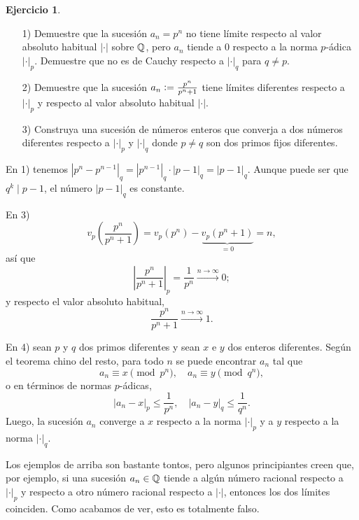 \documentclass{article}
\numberwithin{equation}{section}
\theoremstyle{definition}
\newtheorem{ejerc}{Ejercicio}
\begin{document}
\begin{ejerc}
  ~

  \begin{enumerate}
  \item[1)] Demuestre que la sucesión $a_n = p^n$ no tiene límite respecto
    al valor absoluto habitual $|\cdot|$ sobre $\mathbb{Q}$, pero $a_n$ tiende a $0$
    respecto a la norma $p$-ádica $|\cdot|_p$. Demuestre que no es de Cauchy
    respecto a $|\cdot|_q$ para $q\ne p$.

  \item[2)] Demuestre que la sucesión $a_n \mathrel{\mathop:}= \frac{p^n}{p^n + 1}$ tiene
    límites diferentes respecto a $|\cdot|_p$ y respecto al valor absoluto
    habitual $|\cdot|$.

  \item[3)] Construya una sucesión de números enteros que converja a dos números
    diferentes respecto a $|\cdot|_p$ y $|\cdot|_q$ donde $p\ne q$ son dos
    primos fijos diferentes.
  \end{enumerate}

  \ifdefined\solutions\begin{solucion}
    En 1) tenemos
    $|p^n - p^{n-1}|_q = |p^{n-1}|_q\cdot |p-1|_q = |p-1|_q$.
    Aunque puede ser que $q^k \mid p-1$, el número $|p-1|_q$ es constante.

    En 3)
    \[ v_p \left(\frac{p^n}{p^n + 1}\right) =
       v_p (p^n) - \underbrace{v_p (p^n + 1)}_{= 0} = n, \]
    así que
    \[ \left|\frac{p^n}{p^n + 1}\right|_p = \frac{1}{p^n}
       \xrightarrow{n\to\infty} 0; \]
    y respecto el valor absoluto habitual,
    $$\frac{p^n}{p^n + 1} \xrightarrow{n\to\infty} 1.$$

    En 4) sean $p$ y $q$ dos primos diferentes y sean $x$ e $y$ dos enteros
    diferentes. Según el teorema chino del resto, para todo $n$ se puede
    encontrar $a_n$ tal que
    $$a_n \equiv x \pmod{p^n}, \quad a_n \equiv y \pmod{q^n},$$
    o en términos de normas $p$-ádicas,
    $$|a_n - x|_p \le \frac{1}{p^n}, \quad |a_n - y|_q \le \frac{1}{q^n}.$$
    Luego, la sucesión $a_n$ converge a $x$ respecto a la norma $|\cdot|_p$
    y a $y$ respecto a la norma $|\cdot|_q$.
  \end{solucion}\fi
\end{ejerc}

Los ejemplos de arriba son bastante tontos, pero algunos principiantes creen
que, por ejemplo, si una sucesión $a_n\in\mathbb{Q}$ tiende a algún número racional
respecto a $|\cdot|_p$ y respecto a otro número racional respecto a $|\cdot|$,
entonces los dos límites coinciden. Como acabamos de ver, esto es totalmente
falso.
\end{document}
